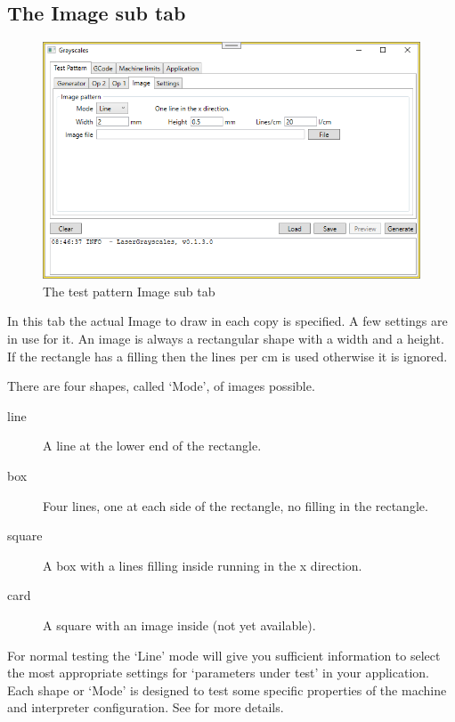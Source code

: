 \subsection{The Image sub tab}\label{TestPatternImageTab}
\begin{figure}[h!]
    \centering
    \includegraphics[width=0.8\linewidth]{./images/Image.png}
    \caption{The test pattern Image sub tab}
\end{figure}

In this tab the actual Image to draw in each copy is specified. A few settings are in use for it. An image is always a rectangular shape with a width and a height.
If the rectangle has a filling then the lines per cm is used otherwise it is ignored.

There are four shapes, called `Mode', of images possible.
\begin{description}
    \item[line]   A line at the lower end of the rectangle.
    \item[box]    Four lines, one at each side of the rectangle, no filling in the rectangle.
    \item[square] A box with a lines filling inside running in the x direction.
    \item[card]   A square with an image inside (not yet available).
\end{description}

For normal testing the `Line' mode will give you sufficient information to select the most appropriate settings for `parameters under test' in your application.
Each shape or `Mode' is designed to test some specific properties of the machine and interpreter configuration. See  for more details.

